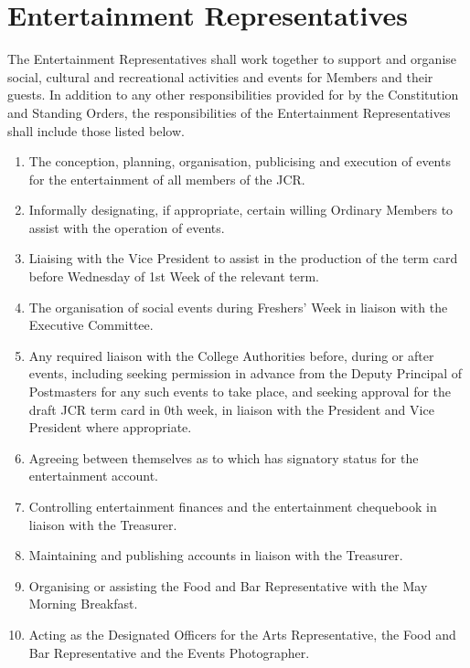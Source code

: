 \section{Entertainment Representatives}
\npara The Entertainment Representatives shall work together to support and organise social, cultural and recreational activities and events for Members  and their guests.
\npara In addition to any other responsibilities provided for by the Constitution and Standing Orders, the responsibilities of the Entertainment Representatives shall include those listed below.
\begin{enumerate}
	\item The conception, planning, organisation, publicising and execution of events for the entertainment of all members of the JCR.
	\item Informally designating, if appropriate, certain willing Ordinary Members to assist with the operation of events.
	\item Liaising with the Vice President to assist in the production of the term card before Wednesday of 1st Week of the relevant term.
	\item The organisation of social events during Freshers' Week in liaison with the Executive Committee.
	\item Any required liaison with the College Authorities before, during or after events, including seeking permission in advance from the Deputy Principal of Postmasters for any such events to take place, and seeking approval for the draft JCR term card in 0th week, in liaison with the President and Vice President where appropriate.
	\item Agreeing between themselves as to which has signatory status for the entertainment account.
	\item Controlling entertainment finances and the entertainment chequebook in liaison with the Treasurer.     
	\item Maintaining and publishing accounts in liaison with the Treasurer.
	\item Organising or assisting the Food and Bar Representative with the May Morning Breakfast. 
	\item Acting as the Designated Officers for the Arts Representative, the Food and Bar Representative and the Events Photographer.
\end{enumerate}
